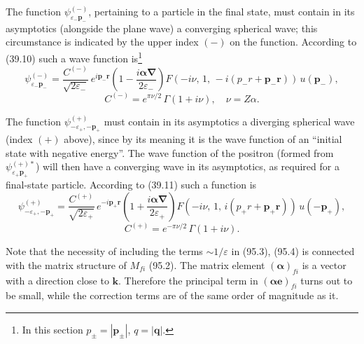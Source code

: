 The function $\psi_{\varepsilon_-\mathbf{p}_-}^{(-)}$, pertaining to a particle in the final state, must contain in its asymptotics (alongside the plane wave) a converging spherical wave; this circumstance is indicated by the upper index $(-)$ on the function. According to (39.10) such a wave function is\footnote{In this section $p_\pm = |\mathbf{p}_\pm|$, $q = |\mathbf{q}|$.}
\begin{equation}
\psi_{\varepsilon_-\mathbf{p}_-}^{(-)} = \frac{C^{(-)}}{\sqrt{2\varepsilon_-}}\,e^{i\mathbf{p}_-\mathbf{r}}\!\left(1 - \frac{i\boldsymbol{\alpha}\boldsymbol{\nabla}}{2\varepsilon_-}\right)F(-i\nu,\,1,\,-i(p_- r + \mathbf{p}_-\mathbf{r}))\,u(\mathbf{p}_-),
\label{eq:95.3}
\end{equation}
\[
C^{(-)} = e^{\pi\nu/2}\,\Gamma(1 + i\nu), \quad \nu = Z\alpha.
\]

The function $\psi_{-\varepsilon_+,-\mathbf{p}_+}^{(+)}$ must contain in its asymptotics a diverging spherical wave (index $(+)$ above), since by its meaning it is the wave function of an ``initial state with negative energy''. The wave function of the positron (formed from $\psi_{\varepsilon_+\mathbf{p}_+}^{(+)*}$) will then have a converging wave in its asymptotics, as required for a final-state particle. According to (39.11) such a function is
\begin{equation}
\psi_{-\varepsilon_+,-\mathbf{p}_+}^{(+)} = \frac{C^{(+)}}{\sqrt{2\varepsilon_+}}\,e^{-i\mathbf{p}_+\mathbf{r}}\!\left(1 + \frac{i\boldsymbol{\alpha}\boldsymbol{\nabla}}{2\varepsilon_+}\right)F(-i\nu,\,1,\,i(p_+ r + \mathbf{p}_+\mathbf{r}))\,u(-\mathbf{p}_+),
\label{eq:95.4}
\end{equation}
\[
C^{(+)} = e^{-\pi\nu/2}\,\Gamma(1 + i\nu).
\]


Note that the necessity of including the terms $\sim 1/\varepsilon$ in (95.3), (95.4) is connected with the matrix structure of $M_{fi}$ (95.2). The matrix element $(\boldsymbol{\alpha})_{fi}$ is a vector with a direction close to $\mathbf{k}$. Therefore the principal term in $(\boldsymbol{\alpha}\mathbf{e})_{fi}$ turns out to be small, while the correction terms are of the same order of magnitude as it.


